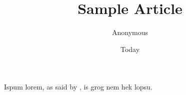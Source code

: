 \documentclass[11pt]{article}
\begin{document}
\title{Sample Article}
\author{Anonymous}
\date{Today}
\maketitle

Ispum lorem, as said by \cite{Bloggs70}, is grog nem hek lopsu.

{}

\end{document}
